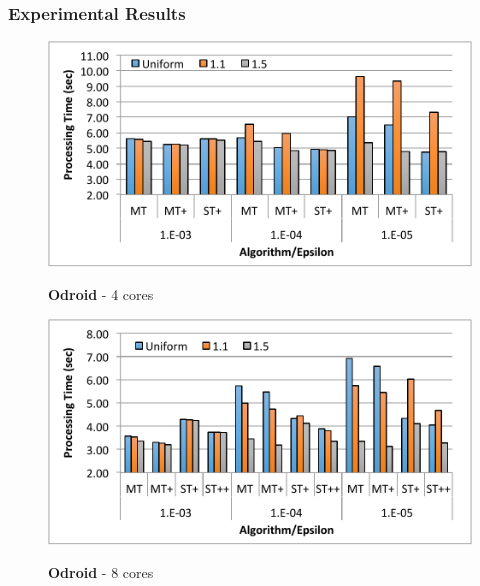 \documentclass{beamer}
\begin{document}
\begin{frame}
	\frametitle{Experimental Results}
	\begin{figure}[H]\hspace*{-12mm}
		
		\begin{minipage}[c]{0.7\textwidth}
			\includegraphics[scale=0.40]{main_3_4.pdf}
		\end{minipage}
		\begin{minipage}[c]{0.25\textwidth} {{\bf Odroid} - 4 cores} \end{minipage}

		\begin{minipage}[c]{0.7\textwidth}
			\includegraphics[scale=0.43]{main_3_8.pdf}
		\end{minipage}
		\begin{minipage}[c]{0.25\textwidth} {{\bf Odroid} - 8 cores} \end{minipage}
		\end{figure}
\end{frame}
\end{document}
